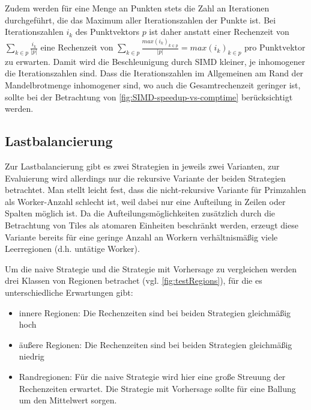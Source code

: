 Zudem werden für eine Menge an Punkten stets die Zahl an Iterationen durchgeführt,
die das Maximum aller Iterationszahlen der Punkte ist.
Bei Iterationszahlen \(i_k\) des Punktvektors \(p\) ist daher
anstatt einer Rechenzeit von \(\sum_{k \in p} \frac{i_k }{ | p | }\) eine Rechenzeit von
\(\sum_{k \in p} \frac{max(i_k)_{k \in p }}{|p|} = max(i_k)_{k \in p }\) pro Punktvektor zu erwarten.
Damit wird die Beschleunigung durch SIMD kleiner, je inhomogener die Iterationszahlen sind.
Dass die Iterationszahlen im Allgemeinen am Rand der Mandelbrotmenge inhomogener sind,
wo auch die Gesamtrechenzeit geringer ist, sollte bei der Betrachtung von \autoref{fig:SIMD-speedup-vs-comptime} berücksichtigt werden.


\subsection{Lastbalancierung}
Zur Lastbalancierung gibt es zwei Strategien in jeweils zwei Varianten, zur Evaluierung wird allerdings nur die rekursive Variante der beiden Strategien betrachtet.
Man stellt leicht fest, dass die nicht-rekursive Variante für Primzahlen als Worker-Anzahl schlecht ist, weil dabei nur eine Aufteilung in Zeilen oder Spalten möglich ist.
Da die Aufteilungsmöglichkeiten zusätzlich durch die Betrachtung von Tiles als atomaren Einheiten beschränkt werden, erzeugt diese Variante bereits für eine geringe Anzahl an Workern verhältnismäßig viele Leerregionen (d.h. untätige Worker).

Um die naive Strategie und die Strategie mit Vorhersage zu vergleichen werden drei Klassen von Regionen betrachet (vgl. \autoref{fig:testRegions}), für die es unterschiedliche Erwartungen gibt:

\begin{itemize}
	\item innere Regionen: Die Rechenzeiten sind bei beiden Strategien gleichmäßig hoch
	\item äußere Regionen: Die Rechenzeiten sind bei beiden Strategien gleichmäßig niedrig
	\item Randregionen: Für die naive Strategie wird hier eine große Streuung der Rechenzeiten erwartet. Die Strategie mit Vorhersage sollte für eine Ballung um den Mittelwert sorgen.
\end{itemize}

